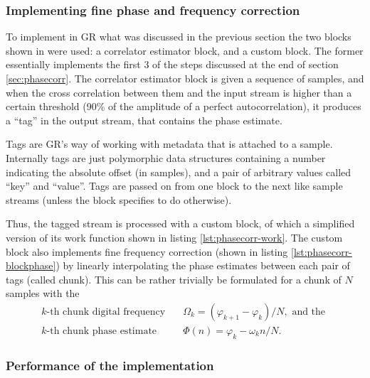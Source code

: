 \subsubsection{Implementing fine phase and frequency correction} \label{sec:implement-phasecorr}

To implement in GR what was discussed in the previous section the two blocks shown in  were used: a correlator estimator block, and a custom block. The former essentially implements the first 3 of the steps discussed at the end of section \ref{sec:phasecorr}. The correlator estimator block is given a sequence of samples, and when the cross correlation between them and the input stream is higher than a certain threshold (90\% of the amplitude of a perfect autocorrelation), it produces a ``tag'' in the output stream, that contains the phase estimate.

Tags are GR's way of working with metadata that is attached to a sample. Internally tags are just polymorphic data structures containing a number indicating the absolute offset (in samples), and a pair of arbitrary values called ``key'' and ``value''. Tags are passed on from one block to the next like sample streams (unless the block specifies to do otherwise).

Thus, the tagged stream is processed with a custom block, of which a simplified version of its work function shown in listing \ref{lst:phasecorr-work}. The custom block also implements fine frequency correction (shown in listing \ref{lst:phasecorr-blockphase}) by linearly interpolating the phase estimates between each pair of tags (called chunk). This can be rather trivially be formulated for a chunk of \(N\) samples with the
\begin{subequations}
	\begin{align}
		k\text{-th chunk digital frequency} \quad  & \Omega_k = (\varphi_{k+1} - \varphi_k) / N, \text{ and the }\\
		k\text{-th chunk phase estimate} \quad & \Phi(n) = \varphi_k - \omega_k n/N.
	\end{align}
\end{subequations}

\subsubsection{Performance of the implementation}\label{sec:preforming-implementation}

